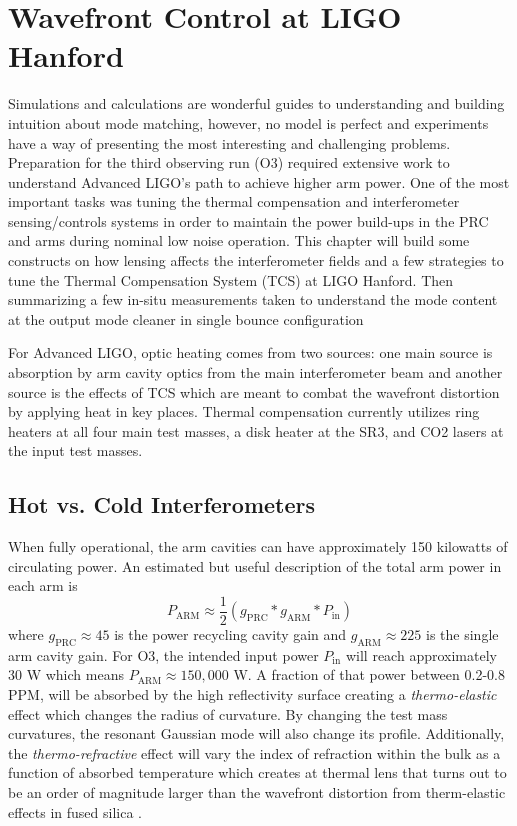 \chapter{Wavefront Control at LIGO Hanford}\label{chapter:MM_LHO}
	Simulations and calculations are wonderful guides to understanding and building intuition about mode matching, however, no model is perfect and experiments have a way of presenting the most interesting and challenging problems.  Preparation for the third observing run (O3) required extensive work to understand Advanced LIGO's path to achieve higher arm power.  One of the most important tasks was tuning the thermal compensation and interferometer sensing/controls systems in order to maintain the power build-ups in the PRC and arms during nominal low noise operation.  This chapter will build some constructs on how lensing affects the interferometer fields and a few strategies to tune the Thermal Compensation System (TCS) at LIGO Hanford. Then summarizing a few in-situ measurements taken to understand the mode content at the output mode cleaner in single bounce configuration
	
	For Advanced LIGO, optic heating comes from two sources: one main source is absorption by arm cavity optics from the main interferometer beam and another source is the effects of TCS which are meant to combat the wavefront distortion by applying heat in key places.  Thermal compensation currently utilizes ring heaters at all four main test masses, a disk heater at the SR3, and CO2 lasers at the input test masses.
	
	\section{Hot vs. Cold Interferometers}\label{sec:hotcoldifo}
	When fully operational, the arm cavities can have approximately 150 kilowatts of circulating power. An estimated but useful description of the total arm power in each arm is
	\begin{equation}
		P_{\text{ARM}} \approx \frac{1}{2} (g_{\text{PRC}} * g_{\text{ARM}} * P_{\text{in}})
	\end{equation}
	where $g_{\text{PRC}} \approx 45$ is the power recycling cavity gain and $g_{\text{ARM}} \approx 225$ is the single arm cavity gain. For O3, the intended input power $P_{\text{in}}$ will reach approximately 30 W which means $P_{\text{ARM}} \approx 150,000$ W. A fraction of that power between 0.2-0.8 PPM, will be absorbed by the high reflectivity surface creating a \textit{thermo-elastic} effect which changes the radius of curvature. By changing the test mass curvatures, the resonant Gaussian mode will also change its profile. Additionally, the \textit{thermo-refractive} effect will vary the index of refraction within the bulk as a function of absorbed temperature which creates at thermal lens that turns out to be an order of magnitude larger than the wavefront distortion from therm-elastic effects in fused silica \cite{winkler_thermaldist}.
	
